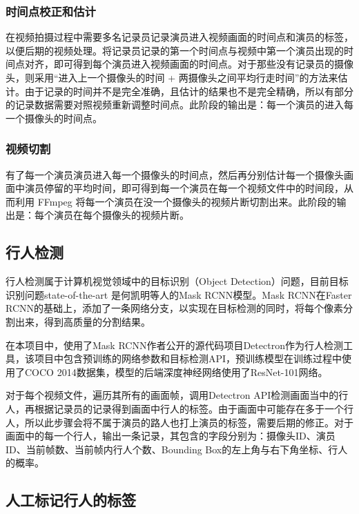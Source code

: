 \subsubsection{时间点校正和估计}

在视频拍摄过程中需要多名记录员记录演员进入视频画面的时间点和演员的标签，以便后期的视频处理。将记录员记录的第一个时间点与视频中第一个演员出现的时间点对齐，即可得到每个演员进入视频画面的时间点。对于那些没有记录员的摄像头，则采用“进入上一个摄像头的时间 + 两摄像头之间平均行走时间”的方法来估计。由于记录的时间并不是完全准确，且估计的结果也不是完全精确，所以有部分的记录数据需要对照视频重新调整时间点。此阶段的输出是：每一个演员的进入每一个摄像头的时间点。

\subsubsection{视频切割}

有了每一个演员演员进入每一个摄像头的时间点，然后再分别估计每一个摄像头画面中演员停留的平均时间，即可得到每一个演员在每一个视频文件中的时间段，从而利用 FFmpeg 将每一个演员在没一个摄像头的视频片断切割出来。此阶段的输出是：每个演员在每个摄像头的视频片断。

\subsection{行人检测}

行人检测属于计算机视觉领域中的目标识别（Object Detection）问题，目前目标识别问题state-of-the-art 是何凯明等人的Mask RCNN\cite{he2017mask}模型。Mask RCNN在Faster RCNN\cite{ren2015faster}的基础上，添加了一条网络分支，以实现在目标检测的同时，将每个像素分割出来，得到高质量的分割结果。

在本项目中，使用了Mask RCNN作者公开的源代码项目Detectron\cite{Detectron2018}作为行人检测工具，该项目中包含预训练的网络参数和目标检测API，预训练模型在训练过程中使用了COCO 2014\cite{lin2014microsoft}数据集，模型的后端深度神经网络使用了ResNet-101\cite{he2016deep}网络。

对于每个视频文件，遍历其所有的画面帧，调用Detectron API检测画面当中的行人，再根据记录员的记录得到画面中行人的标签。由于画面中可能存在多于一个行人，所以此步骤会将不属于演员的路人也打上演员的标签，需要后期的修正。对于画面中的每一个行人，输出一条记录，其包含的字段分别为：摄像头ID、演员ID、当前帧数、当前帧内行人个数、Bounding Box的左上角与右下角坐标、行人的概率。

\subsection{人工标记行人的标签}


